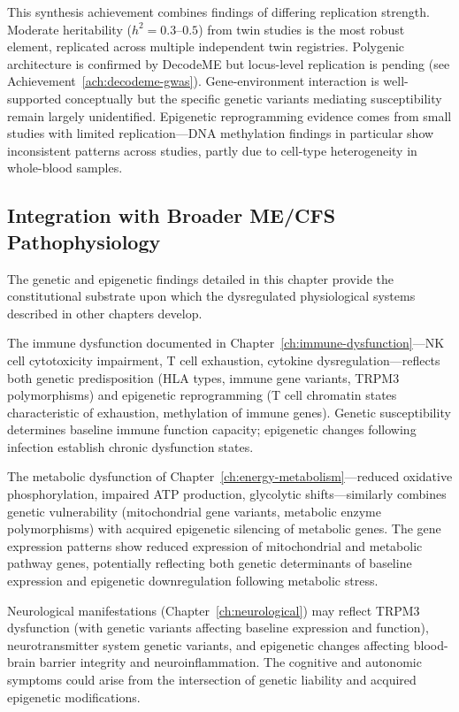 \begin{warning}
This synthesis achievement combines findings of differing replication strength. Moderate heritability ($h^2 = 0.3$--$0.5$) from twin studies is the most robust element, replicated across multiple independent twin registries. Polygenic architecture is confirmed by DecodeME but locus-level replication is pending (see Achievement~\ref{ach:decodeme-gwas}). Gene-environment interaction is well-supported conceptually but the specific genetic variants mediating susceptibility remain largely unidentified. Epigenetic reprogramming evidence comes from small studies with limited replication---DNA methylation findings in particular show inconsistent patterns across studies, partly due to cell-type heterogeneity in whole-blood samples.
\end{warning}

\subsection{Integration with Broader ME/CFS Pathophysiology}

The genetic and epigenetic findings detailed in this chapter provide the constitutional substrate upon which the dysregulated physiological systems described in other chapters develop.

The immune dysfunction documented in Chapter~\ref{ch:immune-dysfunction}---NK cell cytotoxicity impairment, T cell exhaustion, cytokine dysregulation---reflects both genetic predisposition (HLA types, immune gene variants, TRPM3 polymorphisms) and epigenetic reprogramming (T cell chromatin states characteristic of exhaustion, methylation of immune genes). Genetic susceptibility determines baseline immune function capacity; epigenetic changes following infection establish chronic dysfunction states.

The metabolic dysfunction of Chapter~\ref{ch:energy-metabolism}---reduced oxidative phosphorylation, impaired ATP production, glycolytic shifts---similarly combines genetic vulnerability (mitochondrial gene variants, metabolic enzyme polymorphisms) with acquired epigenetic silencing of metabolic genes. The gene expression patterns show reduced expression of mitochondrial and metabolic pathway genes, potentially reflecting both genetic determinants of baseline expression and epigenetic downregulation following metabolic stress.

Neurological manifestations (Chapter~\ref{ch:neurological}) may reflect TRPM3 dysfunction (with genetic variants affecting baseline expression and function), neurotransmitter system genetic variants, and epigenetic changes affecting blood-brain barrier integrity and neuroinflammation. The cognitive and autonomic symptoms could arise from the intersection of genetic liability and acquired epigenetic modifications.

